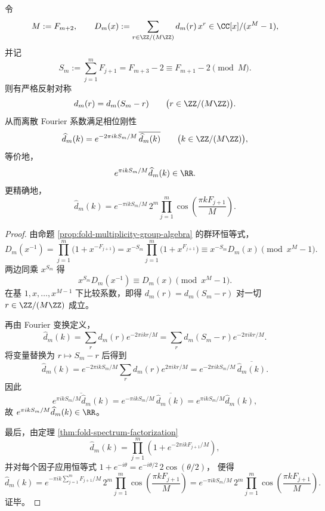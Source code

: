 \begin{theorem}\label{thm:killo-fold-fourier-reflection-phase-rigidity}
令
\[
M:=F_{m+2},
\qquad
D_m(x):=\sum_{r\in \ZZ/(M\ZZ)}d_m(r)\,x^r\in \CC[x]/(x^M-1),
\]
并记
\[
S_m:=\sum_{j=1}^{m}F_{j+1}=F_{m+3}-2\equiv F_{m+1}-2\pmod M.
\]
则有严格反射对称
\[
d_m(r)=d_m(S_m-r)
\qquad
\bigl(r\in \ZZ/(M\ZZ)\bigr).
\]
从而离散 Fourier 系数满足相位刚性
\[
\widehat d_m(k)=e^{-2\pi i kS_m/M}\,\overline{\widehat d_m(k)}
\qquad
\bigl(k\in \ZZ/(M\ZZ)\bigr),
\]
等价地，
\[
e^{\pi i kS_m/M}\widehat d_m(k)\in \RR.
\]
更精确地，
\[
\widehat d_m(k)
=
e^{-\pi i kS_m/M}\,
2^m\prod_{j=1}^{m}\cos\!\left(\frac{\pi kF_{j+1}}{M}\right).
\]
\end{theorem}
\begin{proof}
由命题 \ref{prop:fold-multiplicity-group-algebra} 的群环恒等式，
\[
D_m(x^{-1})
=
\prod_{j=1}^{m}\bigl(1+x^{-F_{j+1}}\bigr)
=
x^{-S_m}\prod_{j=1}^{m}\bigl(1+x^{F_{j+1}}\bigr)
\equiv
x^{-S_m}D_m(x)
\pmod{x^M-1}.
\]
两边同乘 \(x^{S_m}\) 得
\[
x^{S_m}D_m(x^{-1})\equiv D_m(x)\pmod{x^M-1}.
\]
在基 \(1,x,\dots,x^{M-1}\) 下比较系数，即得
\(
d_m(r)=d_m(S_m-r)
\)
对一切 \(r\in \ZZ/(M\ZZ)\) 成立。

再由 Fourier 变换定义，
\[
\widehat d_m(k)
=
\sum_{r}d_m(r)e^{-2\pi i kr/M}
=
\sum_{r}d_m(S_m-r)e^{-2\pi i kr/M}.
\]
将变量替换为 \(r\mapsto S_m-r\) 后得到
\[
\widehat d_m(k)
=
e^{-2\pi i kS_m/M}\sum_{r}d_m(r)e^{2\pi i kr/M}
=
e^{-2\pi i kS_m/M}\,\overline{\widehat d_m(k)}.
\]
因此
\[
\overline{e^{\pi i kS_m/M}\widehat d_m(k)}
=
e^{-\pi i kS_m/M}\,\overline{\widehat d_m(k)}
=
e^{\pi i kS_m/M}\widehat d_m(k),
\]
故 \(e^{\pi i kS_m/M}\widehat d_m(k)\in\RR\)。

最后，由定理 \ref{thm:fold-spectrum-factorization}
\[
\widehat d_m(k)=\prod_{j=1}^{m}\left(1+e^{-2\pi i kF_{j+1}/M}\right),
\]
并对每个因子应用恒等式
\(
1+e^{-i\theta}=e^{-i\theta/2}\,2\cos(\theta/2)
\)，
便得
\[
\widehat d_m(k)
=
e^{-\pi i k\sum_{j=1}^{m}F_{j+1}/M}\,
2^m\prod_{j=1}^{m}\cos\!\left(\frac{\pi kF_{j+1}}{M}\right)
=
e^{-\pi i kS_m/M}\,
2^m\prod_{j=1}^{m}\cos\!\left(\frac{\pi kF_{j+1}}{M}\right).
\]
证毕。
\end{proof}

